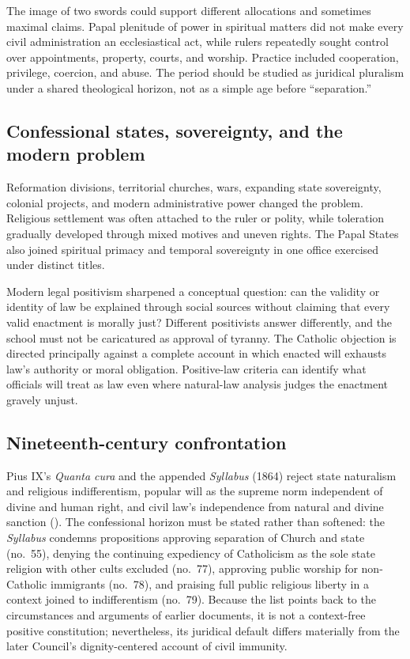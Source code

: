 The image of two swords could support different allocations and sometimes maximal claims. Papal plenitude of power in spiritual matters did not make every civil administration an ecclesiastical act, while rulers repeatedly sought control over appointments, property, courts, and worship. Practice included cooperation, privilege, coercion, and abuse. The period should be studied as juridical pluralism under a shared theological horizon, not as a simple age before ``separation.''

\subsection{Confessional states, sovereignty, and the modern problem}

Reformation divisions, territorial churches, wars, expanding state sovereignty, colonial projects, and modern administrative power changed the problem. Religious settlement was often attached to the ruler or polity, while toleration gradually developed through mixed motives and uneven rights. The Papal States also joined spiritual primacy and temporal sovereignty in one office exercised under distinct titles.

Modern legal positivism sharpened a conceptual question: can the validity or identity of law be explained through social sources without claiming that every valid enactment is morally just? Different positivists answer differently, and the school must not be caricatured as approval of tyranny. The Catholic objection is directed principally against a complete account in which enacted will exhausts law's authority or moral obligation. Positive-law criteria can identify what officials will treat as law even where natural-law analysis judges the enactment gravely unjust.

\subsection{Nineteenth-century confrontation}

Pius IX's \emph{Quanta cura} and the appended \emph{Syllabus} (1864) reject state naturalism and religious indifferentism, popular will as the supreme norm independent of divine and human right, and civil law's independence from natural and divine sanction (). The confessional horizon must be stated rather than softened: the \emph{Syllabus} condemns propositions approving separation of Church and state (no.~55), denying the continuing expediency of Catholicism as the sole state religion with other cults excluded (no.~77), approving public worship for non-Catholic immigrants (no.~78), and praising full public religious liberty in a context joined to indifferentism (no.~79). Because the list points back to the circumstances and arguments of earlier documents, it is not a context-free positive constitution; nevertheless, its juridical default differs materially from the later Council's dignity-centered account of civil immunity.

